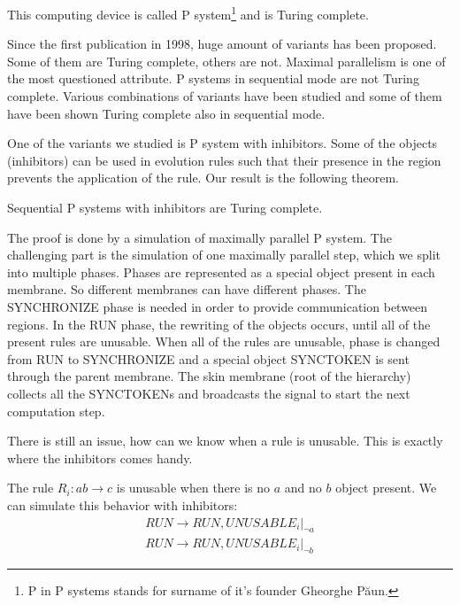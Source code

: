 \documentclass{svk_short_en}
\begin{document}
This computing device is called P system\footnote{P in P systems stands for surname of it's founder Gheorghe P\u aun.} and is Turing complete.

Since the first publication in 1998, huge amount of variants has been proposed. Some of them are Turing complete, others are not. Maximal parallelism is one of the most questioned attribute. P systems in sequential mode are not Turing complete. Various combinations of variants have been studied and some of them have been shown Turing complete also in sequential mode.

One of the variants we studied is P system with inhibitors. Some of the objects (inhibitors) can be used in evolution rules such that their presence in the region prevents the application of the rule. Our result is the following theorem.

\begin{theorem}
\label{th:prop}
Sequential P systems with inhibitors are Turing complete.
\end{theorem}

The proof is done by a simulation of maximally parallel P system. The challenging part is the simulation of one maximally parallel step, which we split into  multiple phases. Phases are represented as a special object present in each membrane. So different membranes can have different phases.
The SYNCHRONIZE phase is needed in order to provide communication between regions.
In the RUN phase, the rewriting of the objects occurs, until all of the present rules are unusable. When all of the rules are unusable, phase is changed from RUN to SYNCHRONIZE and a special object SYNCTOKEN is sent through the parent membrane. The skin membrane (root of the hierarchy) collects all the SYNCTOKENs and broadcasts the signal to start the next computation step.

There is still an issue, how can we know when a rule is unusable. This is exactly where the inhibitors comes handy.

The rule $R_i: ab \rightarrow c$ is unusable when there is no $a$ and no $b$ object present. We can simulate this behavior with inhibitors:
\begin{align*}
  RUN \rightarrow RUN, UNUSABLE_i |_{\neg a}
  \\
  RUN \rightarrow RUN, UNUSABLE_i |_{\neg b}
\end{align*}




\end{document}
